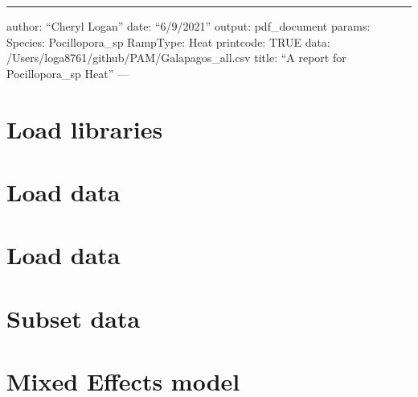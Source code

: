 \documentclass[
]{article}
\author{}
\date{\vspace{-2.5em}}
\newenvironment{Shaded}{\begin{snugshade}}{\end{snugshade}}
\newcommand{\CommentTok}[1]{\textcolor[rgb]{0.56,0.35,0.01}{\textit{#1}}}
\newcommand{\FunctionTok}[1]{\textcolor[rgb]{0.00,0.00,0.00}{#1}}
\newcommand{\NormalTok}[1]{#1}
\newcommand{\OtherTok}[1]{\textcolor[rgb]{0.56,0.35,0.01}{#1}}
\newcommand{\SpecialCharTok}[1]{\textcolor[rgb]{0.00,0.00,0.00}{#1}}
\begin{document}
\begin{center}\rule{0.5\linewidth}{0.5pt}\end{center}

author: ``Cheryl Logan'' date: ``6/9/2021'' output: pdf\_document
params: Species: Pocillopora\_sp RampType: Heat printcode: TRUE data:
/Users/loga8761/github/PAM/Galapagos\_all.csv title: ``A report for
Pocillopora\_sp Heat'' ---

\hypertarget{load-libraries}{%
\section{Load libraries}\label{load-libraries}}

\hypertarget{load-data}{%
\section{Load data}\label{load-data}}

\hypertarget{load-data-1}{%
\section{Load data}\label{load-data-1}}

\hypertarget{subset-data}{%
\section{Subset data}\label{subset-data}}

\begin{Shaded}
\end{Shaded}

\hypertarget{mixed-effects-model}{%
\section{Mixed Effects model}\label{mixed-effects-model}}
\end{document}
